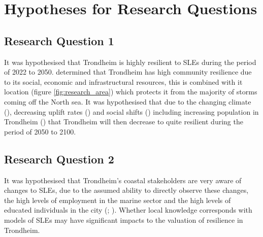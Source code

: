 \section{Hypotheses for Research Questions}\label{hypotheses-intro}

\subsection{Research Question 1}
It was hypothesised that Trondheim is highly resilient to SLEs during the period of 2022 to 2050. \cite{opach_seeking_2020} determined that Trondheim has high community resilience due to its social, economic and infrastructural resources, this is combined with it location (figure \ref{fig:research_area}) which protects it from the majority of storms coming off the North sea. It was hypothesised that due to the changing climate (\cite{ipcc_sea_2021}), decreasing uplift rates (\cite{hanssen-bauer_climate_2017}) and social shifts (\cite{dsb_integrating-sea-level-rise-and-storm-surges--local-planningpdf_2017}) including increasing population in Trondheim (\cite{ssb_kommunefakta_2023}) that Trondheim will then decrease to quite resilient during the period of 2050 to 2100. 
\paragraph{}

 
\subsection{Research Question 2}
It was hypothesised that Trondheim's coastal stakeholders are very aware of changes to SLEs, due to the assumed ability to directly observe these changes, the high levels of employment in the marine sector and the high levels of educated individuals in the city (\cite{opach_seeking_2020}; \cite{lujala_role_2020}). Whether local knowledge corresponds with \cite{kartverket_se_2021} models of SLEs may have significant impacts to the valuation of resilience in Trondheim.

